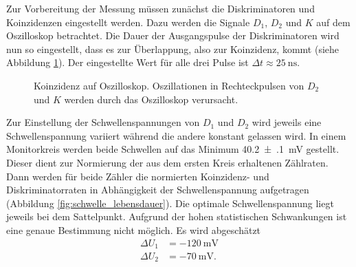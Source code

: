 Zur Vorbereitung der Messung müssen zunächst die Diskriminatoren und Koinzidenzen eingestellt werden. Dazu werden die Signale $D_1$, $D_2$ und $K$ auf dem Oszilloskop betrachtet. Die Dauer der Ausgangspulse der Diskriminatoren wird nun so eingestellt, dass es zur Überlappung, also zur Koinzidenz, kommt (siehe Abbildung \ref{fig:signal_oszi}). Der eingestellte Wert für alle drei Pulse ist $\Delta t \approx \SI{25}{\nano\second}$.

\begin{figure}[h]
  \centering
  \caption{Koinzidenz auf Oszilloskop. Oszillationen in Rechteckpulsen von $D_2$ und $K$ werden durch das Oszilloskop verursacht.}
  \label{fig:signal_oszi}
\end{figure}

Zur Einstellung der Schwellenspannungen von $D_1$ und $D_2$ wird jeweils eine Schwellenspannung variiert während die andere konstant gelassen wird. In einem Monitorkreis werden beide Schwellen auf das Minimum \SI[separate-uncertainty = true]{40.2(1)}{\milli\volt} gestellt. Dieser dient zur Normierung der aus dem ersten Kreis erhaltenen Zählraten. Dann werden für beide Zähler die normierten Koinzidenz- und Diskriminatorraten in Abhängigkeit der Schwellenspannung aufgetragen (Abbildung \ref{fig:schwelle_lebensdauer}). Die optimale Schwellenspannung liegt jeweils bei dem Sattelpunkt. Aufgrund der hohen statistischen Schwankungen ist eine genaue Bestimmung nicht möglich. Es wird abgeschätzt
\begin{align*}
  \Delta U_1&=-\SI{120}{\milli\volt}\\
  \Delta U_2&=-\SI{70}{\milli\volt}.
\end{align*} 


